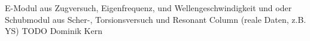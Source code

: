 E-Modul aus Zugversuch, Eigenfrequenz, und Wellengeschwindigkeit 
und oder Schubmodul aus Scher-, Torsionsversuch und Resonant Column
(reale Daten, z.B. YS)
TODO Dominik Kern


